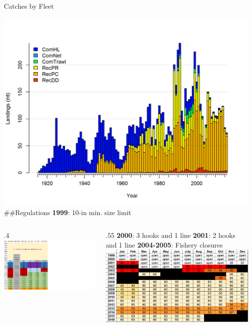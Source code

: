 \documentclass[ignorenonframetext,]{beamer}
\def\begincols{\begin{columns}}
\def\begincol{\begin{column}}
\def\endcol{\end{column}}
\def\endcols{\end{columns}}
\begin{document}
\begin{frame}{Catches by Fleet}

\centering
\includegraphics{r4ss/plots_mod1/catch2 landings stacked.png}
\#\#Regulations \textbf{1999}: 10-in min. size limit \begincols
 \begincol{.4\textwidth} \includegraphics{Figures/Com_regs.png} \endcol
 \begincol{.55\textwidth} \textbf{2000}: 3 hooks and 1 line
\textbf{2001}: 2 hooks and 1 line \textbf{2004-2005}: Fishery closures
\includegraphics{Figures/Rec_regs.pdf}\\
\endcol
\endcols

\end{frame}
\end{document}
